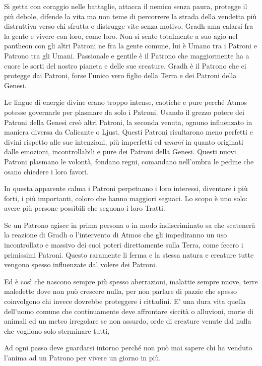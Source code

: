 \begin{multicols}{2}
Si getta con coraggio nelle battaglie, attacca il nemico senza paura, protegge il più debole, difende la vita ma non teme di percorrere la strada della vendetta più distruttiva verso chi sfrutta e distrugge vite senza motivo. Gradh ama calarsi fra la gente e vivere con loro, come loro. Non si sente totalmente a suo agio nel pantheon con gli altri Patroni ne fra la gente comune, lui è Umano tra i Patroni e Patrono tra gli Umani. Passionale e gentile è il Patrono che maggiormente ha a cuore le sorti del nostro pianeta e delle sue creature. Gradh è il Patrono che ci protegge dai Patroni, forse l'unico vero figlio della Terra e dei Patroni della Genesi.

Le lingue di energie divine erano troppo intense, caotiche e pure perché Atmos potesse governarle per plasmare da solo i Patroni. Usando il grezzo potere dei Patroni della Genesi creò altri Patroni, la seconda venuta, ognuno influenzato in maniera diversa da Calicante o Ljust. Questi Patroni risultarono meno perfetti e divini rispetto alle sue intenzioni, più imperfetti ed \emph{umani} in quanto originati dalle emozioni, incontrollabili e pure dei Patroni della Genesi. Questi nuovi Patroni plasmano le volontà, fondano regni, comandano nell'ombra le pedine che osano chiedere i loro favori.

In questa apparente calma i Patroni perpetuano i loro interessi, diventare i più forti, i più importanti, coloro che hanno maggiori seguaci. Lo scopo è uno solo: avere più persone possibili che seguono i loro Tratti.

Se un Patrono agisce in prima persona o in modo indiscriminato sa che scatenerà la reazione di Gradh o l'intervento di Atmos che gli impediranno un uso incontrollato e massivo dei suoi poteri direttamente sulla Terra, come fecero i primissimi Patroni. Questo raramente li ferma e la stessa natura e creature tutte vengono spesso influenzate dal volere dei Patroni.

Ed è così che nascono sempre più spesso aberrazioni, malattie sempre nuove, terre maledette dove non può crescere nulla, per non parlare di pazzie che spesso coinvolgono chi invece dovrebbe proteggere i cittadini.
E' una dura vita quella dell'uomo comune che continuamente deve affrontare siccità o alluvioni, morie di animali ed un meteo irregolare se non assurdo, orde di creature venute dal nulla che vogliono solo sterminare tutti,

Ad ogni passo deve guardarsi intorno perché non può mai sapere chi ha venduto l'anima ad un Patrono per vivere un giorno in più.


\end{multicols}
